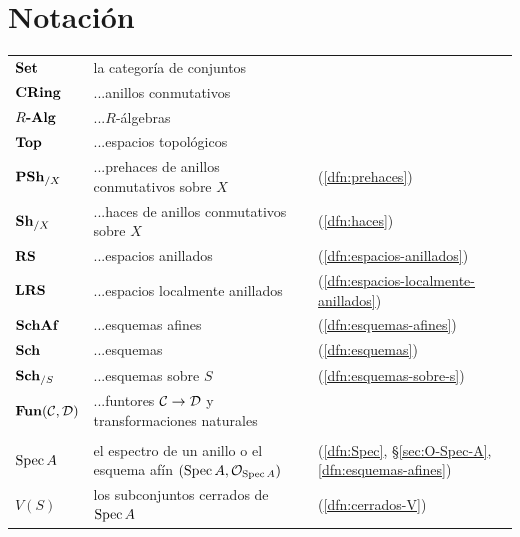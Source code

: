 \documentclass{article}
\numberwithin{equation}{section}
\theoremstyle{definition}
\begin{document}
\pagebreak
\appendix
\section{Notación}

\begin{tabular}{lll}
  $\text{\bf Set}$ & la categoría de conjuntos \\
  $\text{\bf CRing}$ & \hspace{5.5em} ...anillos conmutativos \\
  $R\text{\bf -Alg}$ & \hspace{5.5em} ...$R$-álgebras \\
  $\text{\bf Top}$ & \hspace{5.5em} ...espacios topológicos \\
  $\text{\bf PSh}_{/X}$  & \hspace{5.5em} ...prehaces de anillos conmutativos sobre $X$ & (\ref{dfn:prehaces}) \\
  $\text{\bf Sh}_{/X}$ & \hspace{5.5em} ...haces de anillos conmutativos sobre $X$ & (\ref{dfn:haces}) \\
  $\text{\bf RS}$ & \hspace{5.5em} ...espacios anillados & (\ref{dfn:espacios-anillados}) \\
  $\text{\bf LRS}$ & \hspace{5.5em} ...espacios localmente anillados & (\ref{dfn:espacios-localmente-anillados}) \\
  $\text{\bf SchAf}$ & \hspace{5.5em} ...esquemas afines & (\ref{dfn:esquemas-afines}) \\
  $\text{\bf Sch}$ & \hspace{5.5em} ...esquemas & (\ref{dfn:esquemas}) \\
  $\text{\bf Sch}_{/S}$ & \hspace{5.5em} ...esquemas sobre $S$ & (\ref{dfn:esquemas-sobre-s}) \\
  $\text{\bf Fun} (\mathcal{C}, \mathcal{D})$ & \hspace{5.5em} ...funtores $\mathcal{C}\to\mathcal{D}$ y transformaciones naturales & \\
  \\
  $\operatorname{Spec} A$ & el espectro de un anillo o el esquema afín $(\operatorname{Spec} A, \mathcal{O}_{\operatorname{Spec} A})$ & (\ref{dfn:Spec}, \S\ref{sec:O-Spec-A}, \ref{dfn:esquemas-afines}) \\
  $V(S)$ & los subconjuntos cerrados de $\operatorname{Spec} A$ & (\ref{dfn:cerrados-V}) \\

\end{tabular}
\end{document}
